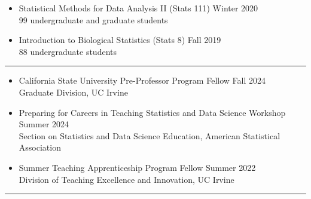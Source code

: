 \documentclass{article}
\begin{document}
\begin{description}
\begin{itemize}
			\item Statistical Methods for Data Analysis II (Stats 111) \hfill{Winter 2020}\\
			99 undergraduate and graduate students %
			
			\item Introduction to Biological Statistics (Stats 8) \hfill{Fall 2019}\\
			88 undergraduate students %
		\end{itemize}
		
	\end{description}
	\vspace{-2mm}
	\rule{\linewidth}{1pt}
	
	
	
	\begin{description}
		\vspace{-2mm}
		\item[Teaching Preparation]\hspace*{.1in}
		
		\begin{itemize}
			\item California State University Pre-Professor Program Fellow \hfill{Fall 2024}\\
			Graduate Division, UC Irvine 
			
			
			\item Preparing for Careers in Teaching Statistics and Data Science Workshop \hfill{Summer 2024}\\
			Section on Statistics and Data Science Education, American Statistical Association 
			
			\item Summer Teaching Apprenticeship Program Fellow \hfill{Summer 2022}\\
			Division of Teaching Excellence and Innovation, UC Irvine
			
		\end{itemize}
	\end{description}
	\vspace{-2mm}
	\rule{\linewidth}{1pt}
	
	
\end{document}

